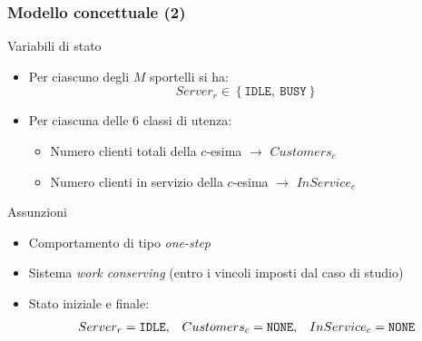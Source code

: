 \documentclass[
	usepdftitle=false,
	xcolor={table, dvipsnames},
	hyperref={
		pdftitle={Studio delle prestazioni di un Ufficio Postale ispirato a Poste Italiane},
    	pdfauthor={A. Chillotti, C. Cuffaro e S. Tiberi}
    }
]{beamer}
\begin{document}
\begin{frame}
\frametitle{Modello concettuale (2)}
\begin{block}{Variabili di stato}
\begin{itemize}
\item Per ciascuno degli $M$ sportelli si ha:
\begin{equation*}
Server_r \in
\left\lbrace \mathtt{IDLE},\ \mathtt{BUSY} \right\rbrace
\end{equation*}
\item Per ciascuna delle 6 classi di utenza:
\begin{itemize}
\item Numero clienti totali della $c$-esima $\to$ $Customers_{c}$
\item Numero clienti in servizio della $c$-esima $\to$ $InService_{c}$
\end{itemize}
\end{itemize}
\end{block}

\begin{block}{Assunzioni}
\begin{itemize}
\item Comportamento di tipo \textsl{one-step}
\item Sistema \textsl{work conserving} (entro i vincoli imposti dal caso di studio)
\item Stato iniziale e finale:
\begin{equation*}
\begin{array}{c c c}
Server_r =\mathtt{IDLE}, & Customers_{c} = \mathtt{NONE}, & InService_{c} = \mathtt{NONE}
\end{array}
\end{equation*}
\end{itemize}
\end{block}
\end{frame}
\end{document}
